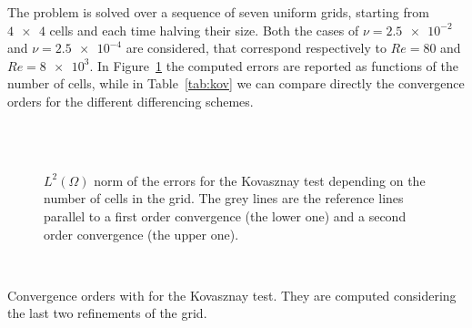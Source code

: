 The problem is solved over a sequence of seven uniform grids, starting from 
$\num{4x4}$ cells and each time halving their size. Both the cases of 
$\nu=\num{2.5e-2}$ and $\nu=\num{2.5e-4}$ are considered, that correspond respectively to 
$Re=80$ and $Re=\num{8e3}$. In Figure~\ref{fig:kov_err} the computed errors are reported as functions of the number of cells, while in 
Table~\ref{tab:kov} we can compare directly the 
convergence orders for the different differencing schemes.
\begin{figure}
	\centering
	\subfloat[Upwind, $Re = 80$]{
		}
	\subfloat[Upwind, $Re = \num{8e3}$]{
		}\\
	\subfloat[Min-Mod, $Re = 80$]{
		}
	\subfloat[Min-Mod, $Re = \num{8e3}$]{
		}\\
	\subfloat[Van Leer, $Re = 80$]{
		}
	\subfloat[Van Leer, $Re = \num{8e3}$]{
		}
	\caption[$L^2(\Omega)$ norm of the errors for the Kovasznay 
	test]{$L^2(\Omega)$ norm of the errors for the 
	Kovasznay test depending on the number of cells in the grid. The grey lines are the reference lines parallel to a first order convergence (the lower one) and a	second order convergence (the upper one).}
	\label{fig:kov_err}
\end{figure}
\begin{table}
	\centering
	\\
	\caption[Convergence orders for the Kovasznay 
	test]{Convergence orders with for the Kovasznay 
	test. They are computed considering the last two refinements of the 
	grid.}
	\label{tab:kov}
\end{table}


